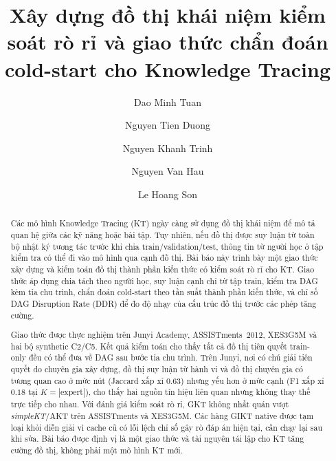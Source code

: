 \documentclass[runningheads]{llncs}
\newcommand{\KC}{thành phần kiến thức}
\newcommand{\DDR}{\textsc{DDR}}
\begin{document}
\title{Xây dựng đồ thị khái niệm kiểm soát rò rỉ và giao thức chẩn đoán cold-start cho Knowledge Tracing}

\author{Dao Minh Tuan \and
Nguyen Tien Duong \and
Nguyen Khanh Trinh \and
Nguyen Van Hau \and
Le Hoang Son}


\maketitle

\begin{abstract}
Các mô hình Knowledge Tracing (KT) ngày càng sử dụng đồ thị khái niệm để mô tả quan hệ giữa các kỹ năng hoặc bài tập. Tuy nhiên, nếu đồ thị được suy luận từ toàn bộ nhật ký tương tác trước khi chia train/validation/test, thông tin từ người học ở tập kiểm tra có thể đi vào mô hình qua cạnh đồ thị. Bài báo này trình bày một giao thức xây dựng và kiểm toán đồ thị \KC{} có kiểm soát rò rỉ cho KT. Giao thức áp dụng chia tách theo người học, suy luận cạnh chỉ từ tập train, kiểm tra DAG kèm tỉa chu trình, chẩn đoán cold-start theo tần suất \KC{}, và chỉ số DAG Disruption Rate (\DDR{}) để đo độ nhạy của cấu trúc đồ thị trước các phép tăng cường.

Giao thức được thực nghiệm trên Junyi Academy, ASSISTments~2012, XES3G5M và hai bộ synthetic C2/C5. Kết quả kiểm toán cho thấy tất cả đồ thị tiên quyết train-only đều có thể đưa về DAG sau bước tỉa chu trình. Trên Junyi, nơi có chú giải tiên quyết do chuyên gia xây dựng, đồ thị suy luận từ hành vi và đồ thị chuyên gia có tương quan cao ở mức nút (Jaccard xấp xỉ $0.63$) nhưng yếu hơn ở mức cạnh (F1 xấp xỉ $0.18$ tại $K=|\text{expert}|$), cho thấy hai nguồn tín hiệu liên quan nhưng không thay thế trực tiếp cho nhau. Với đánh giá kiểm soát rò rỉ, GKT không nhất quán vượt \textit{simpleKT}/AKT trên ASSISTments và XES3G5M. Các hàng GIKT native được tạm loại khỏi diễn giải vì cache cũ có lỗi lệch chỉ số gây rò đáp án hiện tại, cần chạy lại sau khi sửa. Bài báo được định vị là một giao thức và tài nguyên tái lập cho KT tăng cường đồ thị, không phải một mô hình KT mới.
\end{abstract}
\end{document}
